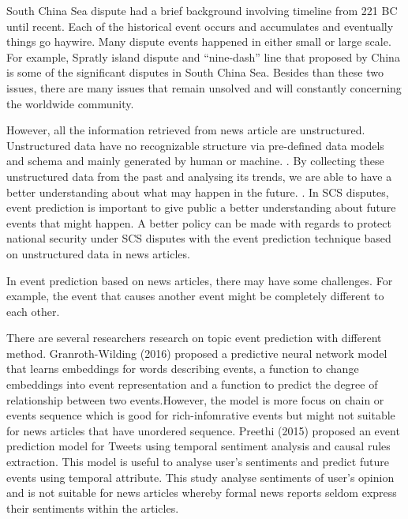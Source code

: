\documentclass[twosides]{utmthesis}
\begin{document}
South China Sea dispute had a brief background involving timeline from 221 BC until recent. Each of the historical event occurs and accumulates and eventually things go haywire. Many dispute events happened in either small or large scale. For example, Spratly island dispute \citep{gonzales2014spratly} and “nine-dash” line  \citep{liuzhen2014} that proposed by China is some of the significant disputes in South China Sea. Besides than these two issues, there are many issues that remain unsolved and will constantly concerning the worldwide community. 

However, all the information retrieved from news article are unstructured. Unstructured data have no recognizable structure via pre-defined data models and schema and mainly generated by human or machine. \citep{christinetaylor2018}. By collecting these unstructured data from the past and analysing its trends, we are able to have a better understanding about what may happen in the future. \citep{bryanbell2016}. In SCS disputes, event prediction is important to give public a better understanding about future events that might happen. A better policy can be made with regards to protect national security under SCS disputes with the event prediction technique based on unstructured data in news articles. 

In event prediction based on news articles, there may have some challenges. For example, the event that causes another event might be completely different to each other.

There are several researchers research on topic event prediction with different method. Granroth-Wilding (2016) proposed a predictive neural network model that learns embeddings for words describing events, a function to change embeddings into event representation and a function to predict the degree of relationship between two events.However, the model is more focus on chain or events sequence which is good for rich-infomrative events but might not suitable for news articles that have unordered sequence. Preethi (2015) proposed an event prediction model for Tweets using temporal sentiment analysis and causal rules extraction. This model is useful to analyse user's sentiments and predict future events using temporal attribute. This study analyse sentiments of user's opinion and is not suitable for news articles whereby formal news reports seldom express their sentiments within the articles. 
\end{document}
